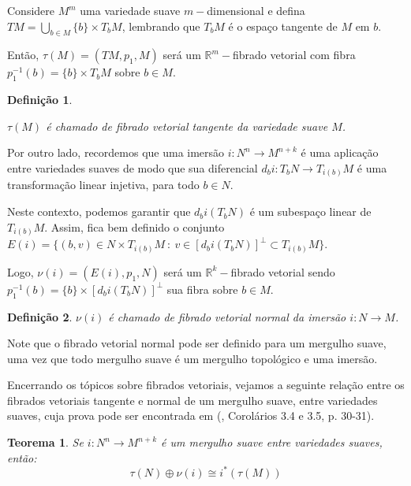 \documentclass[12pt,oneside]{book} %
\newtheorem{defi}   {\hspace{0.5cm}Defini\c c\~ao}[chapter]
\newtheorem{teo}    {\hspace{0.5cm}Teorema}[chapter]
\newcommand{\ds}{\displaystyle}
\newcommand{\R}{\mathbb{R}}
\begin{document}
\par Considere $M^{m}$ uma variedade suave $m-$dimensional e defina $TM=\ds\bigcup_{b\in M}\{b\}\times T_{b}M$, lembrando que $T_{b}M$ é o espaço tangente de $M$ em $b$.

\par Então, $\tau(M)=(TM,p_{1},M)$ será um $\R^{m}-$fibrado vetorial com fibra $p_{1}^{-1}(b)=\{b\}\times T_{b}M$ sobre $b\in M$.

\begin{defi}\label{defi_fvt}
	\par $\tau(M)$ é chamado de fibrado vetorial tangente da variedade suave $M$.
\end{defi}

\par Por outro lado, recordemos que uma imersão $i:N^{n}\to M^{n+k}$ é uma aplicação entre variedades suaves de modo que sua diferencial $d_{b}i:T_{b}N\to T_{i(b)}M$ é uma transformação linear injetiva, para todo $b\in N$.

\par Neste contexto, podemos garantir que $d_{b}i(T_{b}N)$ é um subespaço linear de $T_{i(b)}M$. Assim, fica bem definido o conjunto $E(i)=\{ (b,v)\in N\times T_{i(b)}M \ : \ v\in [d_{b}i(T_{b}N)]^{\perp}\subset T_{i(b)}M \}$.

\par Logo, $\nu(i)=(E(i),p_{1},N)$ será um $\R^{k}-$fibrado vetorial sendo $p_{1}^{-1}(b)=\{b\}\times [d_{b}i(T_{b}N)]^{\perp}$ sua fibra sobre $b\in M$.

\begin{defi}\label{defi_fvn}
	$\nu(i)$ é chamado de fibrado vetorial normal da imersão $i:N\to M$.
\end{defi}

\par Note que o fibrado vetorial normal pode ser definido para um mergulho suave, uma vez que todo mergulho suave é um mergulho topológico e uma imersão.

\par Encerrando os tópicos sobre fibrados vetoriais, vejamos a seguinte relação entre os fibrados vetoriais tangente e normal de um mergulho suave, entre variedades suaves, cuja prova pode ser encontrada em (\cite{milnor_1}, Corolários 3.4 e 3.5, p. 30-31).

\begin{teo}\label{dualidade_whitney_vet}
	Se $i:N^{n}\to M^{n+k}$ é um mergulho suave entre variedades suaves, então:
	$$ \tau(N)\oplus\nu(i)\cong i^{*}(\tau(M)) $$
\end{teo}
\end{document}
